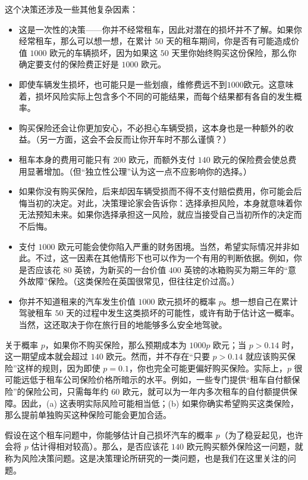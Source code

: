 这个决策还涉及一些其他复杂因素：
\begin{itemize}
\item 这是一次性的决策——你并不经常租车，因此对潜在的损坏并不了解。如果你经常租车，那么可以想一想，在累计 $50$ 天的租车期间，你是否有可能造成价值 $1000$ 欧元的车辆损坏，因为如果这 $50$ 天里你始终购买这份保险，那么你确定要支付的保险费正好是 $1000$ 欧元。

\item 即使车辆发生损坏，也可能只是一些划痕，维修费远不到$1000$欧元。这意味着，损坏风险实际上包含多个不同的可能结果，而每个结果都有各自的发生概率。

\item 购买保险还会让你更加安心，不必担心车辆受损，这本身也是一种额外的收益。（另一方面，这会不会反而让你开车时不那么谨慎？）

\item 租车本身的费用可能只有 $200$ 欧元，而额外支付 $140$ 欧元的保险费会使总费用显著增加。（但“独立性公理”认为这一点不应影响你的选择。）

\item 如果你没有购买保险，后来却因车辆受损而不得不支付赔偿费用，你可能会后悔当初的决定。对此，决策理论家会告诉你：选择承担风险，本身就意味着你无法预知未来。如果你选择承担这一风险，就应当接受自己当初所作的决定而不后悔。

\item 支付 $1000$ 欧元可能会使你陷入严重的财务困境。当然，希望实际情况并非如此。不过，这一因素在其他情形下也可以作为一个有用的判断依据。例如，你是否应该花 $80$ 英镑，为新买的一台价值 $400$ 英镑的冰箱购买为期三年的“意外故障”保险。（这类保险在英国很常见，但往往定价过高。）

\item 你并不知道租来的汽车发生价值 $1000$ 欧元损坏的概率 \(p\)。想一想自己在累计驾驶租车 $50$ 天的过程中发生这类损坏的可能性，或许有助于估计这一概率。当然，这还取决于你在旅行目的地能够多么安全地驾驶。
\end{itemize}
关于概率 \(p\)，如果你不购买保险，那么预期成本为 \(1000p\) 欧元；当 \(p>0.14\) 时，这一期望成本就会超过 $140$ 欧元。然而，并不存在“只要 \(p>0.14\) 就应该购买保险”这样的规则，因为即使 \(p=0.1\)，你也完全可能更偏好购买保险。实际上，\(p\) 很可能远低于租车公司保险价格所暗示的水平。例如，一些专门提供“租车自付额保险”的保险公司，只需每年约 $60$ 欧元，就可以为一年内多次租车的自付额提供保障。因此，(a) 这表明实际风险可能相当低；(b) 如果你确实希望购买这类保险，那么提前单独购买这种保险可能会更加合适。

假设在这个租车问题中，你能够估计自己损坏汽车的概率 \(p\)（为了稳妥起见，也许会将 \(p\) 估计得相对较高）。那么，是否应该花 $140$ 欧元购买额外保险这一问题，就称为风险决策问题。这是决策理论所研究的一类问题，也是我们在这里关注的问题。

